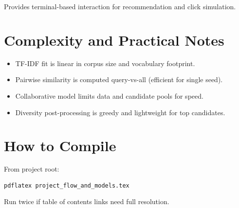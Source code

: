 \documentclass[11pt,a4paper]{article}
\begin{document}
Provides terminal-based interaction for recommendation and click simulation.

\section{Complexity and Practical Notes}
\begin{itemize}[leftmargin=1.5em]
    \item TF-IDF fit is linear in corpus size and vocabulary footprint.
    \item Pairwise similarity is computed query-vs-all (efficient for single seed).
    \item Collaborative model limits data and candidate pools for speed.
    \item Diversity post-processing is greedy and lightweight for top candidates.
\end{itemize}

\section{How to Compile}
From project root:
\begin{verbatim}
pdflatex project_flow_and_models.tex
\end{verbatim}
Run twice if table of contents links need full resolution.
\end{document}
